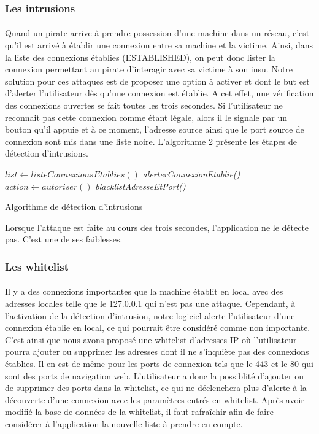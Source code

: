 	  	 \subsubsection{Les intrusions }
      \paragraph{}
	   Quand un pirate arrive à prendre possession d'une machine dans un réseau, c'est qu'il est arrivé à établir une connexion entre sa machine et la victime. Ainsi, dans la liste des connexions établies (ESTABLISHED), on peut donc lister la connexion permettant au pirate d'interagir avec sa victime à son insu. Notre solution pour ces attaques est de proposer une option à activer et dont le but est d'alerter l'utilisateur dès qu'une connexion est établie. A cet effet, une vérification des connexions ouvertes se fait toutes les trois secondes. Si l'utilisateur ne reconnait pas cette connexion comme étant légale, alors il le signale par un bouton qu'il appuie et à ce moment, l'adresse source ainsi que le port source de connexion sont mis dans une liste noire. L'algorithme 2 présente les étapes de détection d'intrusions.
	   
	   
						\begin{algorithm}[H]
\DontPrintSemicolon %

 {
$list \gets listeConnexionsEtablies()$\;
	 {
	\textit{alerterConnexionEtablie()}\;
	$action \gets autoriser()$\; 
   {
   \textit{blacklistAdresseEtPort()}\;
  }
}
}
\;
\caption{Algorithme de détection d'intrusions}
\label{algo:intrusion}
\end{algorithm}

Lorsque l'attaque est faite au cours des trois secondes, l'application ne le détecte pas. C'est une de ses faiblesses. 	   
	   \subsubsection{Les whitelist }
      \paragraph{}
	   Il y a des connexions importantes que la machine établit en local avec des adresses locales telle que le 127.0.0.1 qui n'est pas une attaque. Cependant, à l'activation de la détection d'intrusion, notre logiciel alerte l'utilisateur d'une connexion établie en local, ce qui pourrait être considéré comme non importante. C'est ainsi que nous avons proposé une whitelist d'adresses IP où l'utilisateur pourra ajouter ou supprimer les adresses dont il ne s'inquiète pas des connexions établies. Il en est de même pour les ports de connexion tels que le 443 et le 80 qui sont des ports de navigation web. L'utilisateur a donc la possiblité d'ajouter ou de supprimer des ports dans la whitelist, ce qui ne déclenchera plus d'alerte à la découverte d'une connexion avec les paramètres entrés en whitelist. Après avoir modifié la base de données de la whitelist, il faut rafraîchir afin de faire considérer à l'application la nouvelle liste à prendre en compte.
	 	

